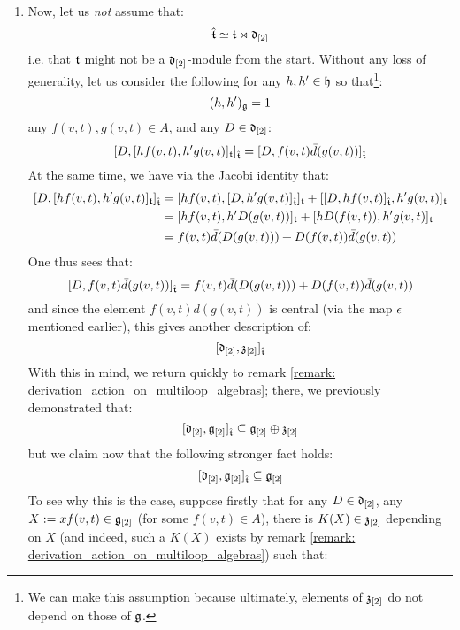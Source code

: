 \begin{remark}
\begin{enumerate}
                \item Now, let us \textit{not} assume that:
                    $$\hat{\mathfrak{t}} \simeq \mathfrak{t}\rtimes \mathfrak{d}_{[2]}$$
                i.e. that $\mathfrak{t}$ might not be a $\mathfrak{d}_{[2]}$-module from the start. Without any loss of generality, let us consider the following for any $h, h' \in \mathfrak{h}$ so that\footnote{We can make this assumption because ultimately, elements of $\mathfrak{z}_{[2]}$ do not depend on those of $\mathfrak{g}$.}:
                    $$(h, h')_{\mathfrak{g}} = 1$$
                any $f(v, t), g(v, t) \in A$, and any $D \in \mathfrak{d}_{[2]}$:
                    $$[ D, [h f(v, t), h' g(v, t)]_{\mathfrak{t}} ]_{\hat{\mathfrak{t}}} = [ D, f(v, t) \bar{d}( g(v, t) ) ]_{\hat{\mathfrak{t}}}$$
                At the same time, we have via the Jacobi identity that:
                    $$
                        \begin{aligned}
                            [ D, [h f(v, t), h' g(v, t)]_{\toroidal} ]_{\extendedtoroidal} & = [ h f(v, t), [D, h' g(v, t)]_{\extendedtoroidal} ]_{\toroidal} + [ [D, h f(v, t)]_{\extendedtoroidal}, h' g(v, t) ]_{\toroidal}
                            \\
                            & = [ h f(v, t), h' D( g(v, t) ) ]_{\toroidal} + [ h D( f(v, t) ), h' g(v, t) ]_{\toroidal}
                            \\
                            & = f(v, t) \bar{d}( D( g(v, t) ) ) + D( f(v, t) ) \bar{d}(g(v, t))
                        \end{aligned}
                    $$
                One thus sees that:
                    $$[ D, f(v, t) \bar{d}( g(v, t) ) ]_{\hat{\mathfrak{t}}} = f(v, t) \bar{d}( D( g(v, t) ) ) + D( f(v, t) ) \bar{d}(g(v, t))$$
                and since the element $f(v, t) \bar{d}( g(v, t) )$ is central (via the map $\epsilon$ mentioned earlier), this gives another description of:
                    $$[ \mathfrak{d}_{[2]}, \mathfrak{z}_{[2]} ]_{\hat{\mathfrak{t}}}$$
                With this in mind, we return quickly to remark \ref{remark: derivation_action_on_multiloop_algebras}; there, we previously demonstrated that:
                    $$[ \mathfrak{d}_{[2]}, \mathfrak{g}_{[2]} ]_{\hat{\mathfrak{t}}} \subseteq \mathfrak{g}_{[2]} \oplus \mathfrak{z}_{[2]}$$
                but we claim now that the following stronger fact holds:
                    $$[ \mathfrak{d}_{[2]}, \mathfrak{g}_{[2]} ]_{\hat{\mathfrak{t}}} \subseteq \mathfrak{g}_{[2]}$$
                To see why this is the case, suppose firstly that for any $D \in \mathfrak{d}_{[2]}$, any $X := x f(v, t) \in \mathfrak{g}_{[2]}$ (for some $f(v, t) \in A$), there is $K(X) \in \mathfrak{z}_{[2]}$ depending on $X$ (and indeed, such a $K(X)$ exists by remark \ref{remark: derivation_action_on_multiloop_algebras}) such that:

\end{enumerate}
\end{remark}
